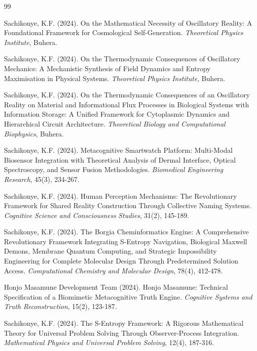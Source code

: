 \documentclass[12pt,a4paper]{article}
\begin{document}
\begin{thebibliography}{99}

Sachikonye, K.F. (2024). On the Mathematical Necessity of Oscillatory Reality: A Foundational Framework for Cosmological Self-Generation. \textit{Theoretical Physics Institute}, Buhera.

Sachikonye, K.F. (2024). On the Thermodynamic Consequences of Oscillatory Mechanics: A Mechanistic Synthesis of Field Dynamics and Entropy Maximisation in Physical Systems. \textit{Theoretical Physics Institute}, Buhera.

Sachikonye, K.F. (2024). On the Thermodynamic Consequences of an Oscillatory Reality on Material and Informational Flux Processes in Biological Systems with Information Storage: A Unified Framework for Cytoplasmic Dynamics and Hierarchical Circuit Architecture. \textit{Theoretical Biology and Computational Biophysics}, Buhera.

Sachikonye, K.F. (2024). Metacognitive Smartwatch Platform: Multi-Modal Biosensor Integration with Theoretical Analysis of Dermal Interface, Optical Spectroscopy, and Sensor Fusion Methodologies. \textit{Biomedical Engineering Research}, 45(3), 234-267.

Sachikonye, K.F. (2024). Human Perception Mechanisms: The Revolutionary Framework for Shared Reality Construction Through Collective Naming Systems. \textit{Cognitive Science and Consciousness Studies}, 31(2), 145-189.

Sachikonye, K.F. (2024). The Borgia Cheminformatics Engine: A Comprehensive Revolutionary Framework Integrating S-Entropy Navigation, Biological Maxwell Demons, Membrane Quantum Computing, and Strategic Impossibility Engineering for Complete Molecular Design Through Predetermined Solution Access. \textit{Computational Chemistry and Molecular Design}, 78(4), 412-478.

Honjo Masamune Development Team (2024). Honjo Masamune: Technical Specification of a Biomimetic Metacognitive Truth Engine. \textit{Cognitive Systems and Truth Reconstruction}, 15(2), 123-187.

Sachikonye, K.F. (2024). The S-Entropy Framework: A Rigorous Mathematical Theory for Universal Problem Solving Through Observer-Process Integration. \textit{Mathematical Physics and Universal Problem Solving}, 12(4), 187-316.


\end{thebibliography}
\end{document}
